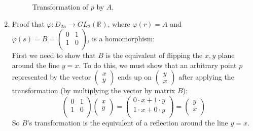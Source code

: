 \documentclass[12pt]{article}
\newcommand{\R}{\mathbb{R}}
\begin{document}
\begin{enumerate}[label=\textbf{\alph*.}]
\begin{figure}[H]
\begin{tikzpicture}[scale=2.5]
                    \end{tikzpicture}
            
                    \caption{\label{fig:figure1} Transformation of $p$ by $A$.}
                \end{figure}
        \item 
            Proof that $\varphi: D_{2n} \to GL_2(\R)$,
            where $\varphi(r) = A$ and $\varphi(s) = B =
            \begin{pmatrix}
                0 & 1 \\
                1 & 0 \\
            \end{pmatrix}$,
            is a homomorphism: \\
            First we need to show that $B$ is the equivalent of flipping
            the $x, y$ plane around the line $y = x$.
            To do this, we must show that an arbitrary point $p$
            represented by the vector $\begin{pmatrix} x \\ y \end{pmatrix}$
            ends up on $\begin{pmatrix} y \\ x \end{pmatrix}$
            after applying the transformation
            (by multiplying the vector by matrix $B$):
            \[  \begin{pmatrix}
                0 & 1 \\
                1 & 0 \\
            \end{pmatrix} 
            \begin{pmatrix}
                x \\
                y \\
            \end{pmatrix} 
            = \begin{pmatrix}
                0 \cdot x + 1 \cdot y \\
                1 \cdot x + 0 \cdot y \\
            \end{pmatrix} 
            =  \begin{pmatrix}
                y \\
                x \\
            \end{pmatrix} \]
            So $B$'s transformation is the equivalent of a reflection 
            around the line $y = x$.
        

\end{enumerate}
\end{document}
